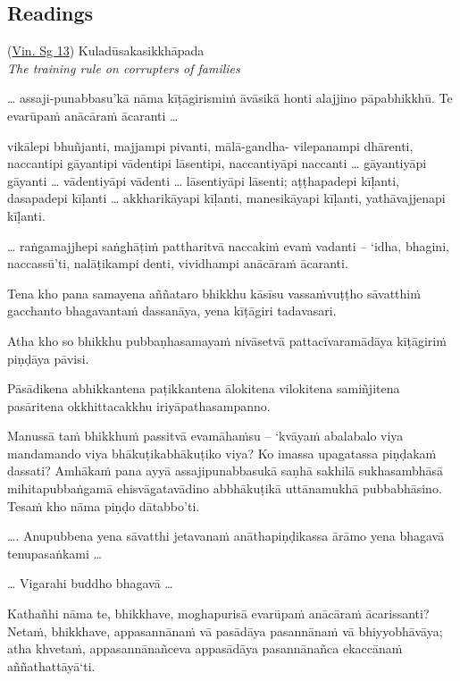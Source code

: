 \documentclass[11pt,oneside]{memoir}
\begin{document}
\normalArrayStrech

\clearpage

\subsection{Readings}
\label{sec:org88d79a9}

\begin{widecols}
(\href{https://suttacentral.net/pli-tv-bu-vb-ss13/pli/ms}{Vin. Sg 13}) Kuladūsakasikkhāpada \\[0pt]
\emph{The training rule on corrupters of families}

\ldots{} assaji-punabbasu'kā nāma kīṭāgirismiṁ āvāsikā honti alajjino pāpabhikkhū. Te evarūpaṁ anācāraṁ ācaranti \ldots{}

vikālepi bhuñjanti, majjampi pivanti, mālā-gandha- vilepanampi dhārenti,
naccantipi gāyantipi vādentipi lāsentipi,
naccantiyāpi naccanti \ldots{} gāyantiyāpi gāyanti \ldots{} vādentiyāpi vādenti \ldots{} lāsentiyāpi lāsenti;
aṭṭhapadepi kīḷanti, dasapadepi kīḷanti \ldots{} akkharikāyapi kīḷanti, manesikāyapi kīḷanti, yathāvajjenapi kīḷanti.

\ldots{} raṅgamajjhepi saṅghāṭiṁ pattharitvā naccakiṁ evaṁ vadanti -- `idha, bhagini,
naccassū'ti, nalāṭikampi denti, vividhampi anācāraṁ ācaranti.

Tena kho pana samayena aññataro bhikkhu kāsīsu vassaṁvuṭṭho sāvatthiṁ gacchanto
bhagavantaṁ dassanāya, yena kīṭāgiri tadavasari.

Atha kho so bhikkhu pubbaṇhasamayaṁ nivāsetvā pattacīvaramādāya kīṭāgiriṁ
piṇḍāya pāvisi.

Pāsādikena abhikkantena paṭikkantena ālokitena vilokitena samiñjitena pasāritena
okkhittacakkhu iriyāpathasampanno.

Manussā taṁ bhikkhuṁ passitvā evamāhaṁsu -- `kvāyaṁ abalabalo viya mandamando viya
bhākuṭikabhākuṭiko viya? Ko imassa upagatassa piṇḍakaṁ dassati? Amhākaṁ pana
ayyā assajipunabbasukā saṇhā sakhilā sukhasambhāsā mihitapubbaṅgamā
ehisvāgatavādino abbhākuṭikā uttānamukhā pubbabhāsino. Tesaṁ kho nāma piṇḍo
dātabbo'ti.

\ldots{}. Anupubbena yena sāvatthi jetavanaṁ anāthapiṇḍikassa ārāmo yena bhagavā tenupasaṅkami \ldots{}

\ldots{} Vigarahi buddho bhagavā \ldots{}

Kathañhi nāma te, bhikkhave, moghapurisā evarūpaṁ anācāraṁ ācarissanti?
Netaṁ, bhikkhave, appasannānaṁ vā pasādāya pasannānaṁ vā bhiyyobhāvāya;
atha khvetaṁ, appasannānañceva appasādāya pasannānañca ekaccānaṁ aññathattāyā`ti.


\end{widecols}
\end{document}
